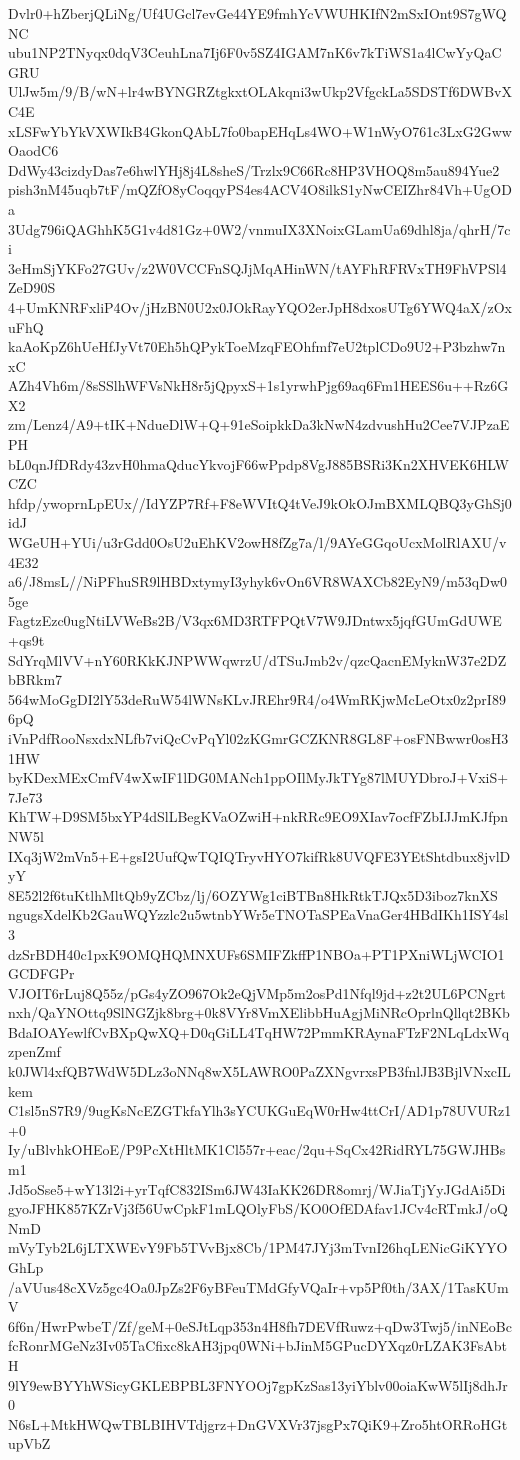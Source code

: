 Dvlr0+hZberjQLiNg/Uf4UGcl7evGe44YE9fmhYcVWUHKIfN2mSxIOnt9S7gWQNC
ubu1NP2TNyqx0dqV3CeuhLna7Ij6F0v5SZ4IGAM7nK6v7kTiWS1a4lCwYyQaCGRU
UlJw5m/9/B/wN+lr4wBYNGRZtgkxtOLAkqni3wUkp2VfgckLa5SDSTf6DWBvXC4E
xLSFwYbYkVXWIkB4GkonQAbL7fo0bapEHqLs4WO+W1nWyO761c3LxG2GwwOaodC6
DdWy43cizdyDas7e6hwlYHj8j4L8sheS/Trzlx9C66Rc8HP3VHOQ8m5au894Yue2
pish3nM45uqb7tF/mQZfO8yCoqqyPS4es4ACV4O8ilkS1yNwCEIZhr84Vh+UgODa
3Udg796iQAGhhK5G1v4d81Gz+0W2/vnmuIX3XNoixGLamUa69dhl8ja/qhrH/7ci
3eHmSjYKFo27GUv/z2W0VCCFnSQJjMqAHinWN/tAYFhRFRVxTH9FhVPSl4ZeD90S
4+UmKNRFxliP4Ov/jHzBN0U2x0JOkRayYQO2erJpH8dxosUTg6YWQ4aX/zOxuFhQ
kaAoKpZ6hUeHfJyVt70Eh5hQPykToeMzqFEOhfmf7eU2tplCDo9U2+P3bzhw7nxC
AZh4Vh6m/8sSSlhWFVsNkH8r5jQpyxS+1s1yrwhPjg69aq6Fm1HEES6u++Rz6GX2
zm/Lenz4/A9+tIK+NdueDlW+Q+91eSoipkkDa3kNwN4zdvushHu2Cee7VJPzaEPH
bL0qnJfDRdy43zvH0hmaQducYkvojF66wPpdp8VgJ885BSRi3Kn2XHVEK6HLWCZC
hfdp/ywoprnLpEUx//IdYZP7Rf+F8eWVItQ4tVeJ9kOkOJmBXMLQBQ3yGhSj0idJ
WGeUH+YUi/u3rGdd0OsU2uEhKV2owH8fZg7a/l/9AYeGGqoUcxMolRlAXU/v4E32
a6/J8msL//NiPFhuSR9lHBDxtymyI3yhyk6vOn6VR8WAXCb82EyN9/m53qDw05ge
FagtzEzc0ugNtiLVWeBs2B/V3qx6MD3RTFPQtV7W9JDntwx5jqfGUmGdUWE+qs9t
SdYrqMlVV+nY60RKkKJNPWWqwrzU/dTSuJmb2v/qzcQacnEMyknW37e2DZbBRkm7
564wMoGgDI2lY53deRuW54lWNsKLvJREhr9R4/o4WmRKjwMcLeOtx0z2prI896pQ
iVnPdfRooNsxdxNLfb7viQcCvPqYl02zKGmrGCZKNR8GL8F+osFNBwwr0osH31HW
byKDexMExCmfV4wXwIF1lDG0MANch1ppOIlMyJkTYg87lMUYDbroJ+VxiS+7Je73
KhTW+D9SM5bxYP4dSlLBegKVaOZwiH+nkRRc9EO9XIav7ocfFZbIJJmKJfpnNW5l
IXq3jW2mVn5+E+gsI2UufQwTQIQTryvHYO7kifRk8UVQFE3YEtShtdbux8jvlDyY
8E52l2f6tuKtlhMltQb9yZCbz/lj/6OZYWg1ciBTBn8HkRtkTJQx5D3iboz7knXS
ngugsXdelKb2GauWQYzzlc2u5wtnbYWr5eTNOTaSPEaVnaGer4HBdIKh1ISY4sl3
dzSrBDH40c1pxK9OMQHQMNXUFs6SMIFZkffP1NBOa+PT1PXniWLjWCIO1GCDFGPr
VJOIT6rLuj8Q55z/pGs4yZO967Ok2eQjVMp5m2osPd1Nfql9jd+z2t2UL6PCNgrt
nxh/QaYNOttq9SlNGZjk8brg+0k8VYr8VmXElibbHuAgjMiNRcOprlnQllqt2BKb
BdaIOAYewlfCvBXpQwXQ+D0qGiLL4TqHW72PmmKRAynaFTzF2NLqLdxWqzpenZmf
k0JWl4xfQB7WdW5DLz3oNNq8wX5LAWRO0PaZXNgvrxsPB3fnlJB3BjlVNxcILkem
C1sl5nS7R9/9ugKsNcEZGTkfaYlh3sYCUKGuEqW0rHw4ttCrI/AD1p78UVURz1+0
Iy/uBlvhkOHEoE/P9PcXtHltMK1Cl557r+eac/2qu+SqCx42RidRYL75GWJHBsm1
Jd5oSse5+wY13l2i+yrTqfC832ISm6JW43IaKK26DR8omrj/WJiaTjYyJGdAi5Di
gyoJFHK857KZrVj3f56UwCpkF1mLQOlyFbS/KO0OfEDAfav1JCv4cRTmkJ/oQNmD
mVyTyb2L6jLTXWEvY9Fb5TVvBjx8Cb/1PM47JYj3mTvnI26hqLENicGiKYYOGhLp
/aVUus48cXVz5gc4Oa0JpZs2F6yBFeuTMdGfyVQaIr+vp5Pf0th/3AX/1TasKUmV
6f6n/HwrPwbeT/Zf/geM+0eSJtLqp353n4H8fh7DEVfRuwz+qDw3Twj5/inNEoBc
fcRonrMGeNz3Iv05TaCfixc8kAH3jpq0WNi+bJinM5GPucDYXqz0rLZAK3FsAbtH
9lY9ewBYYhWSicyGKLEBPBL3FNYOOj7gpKzSas13yiYblv00oiaKwW5lIj8dhJr0
N6sL+MtkHWQwTBLBIHVTdjgrz+DnGVXVr37jsgPx7QiK9+Zro5htORRoHGtupVbZ
